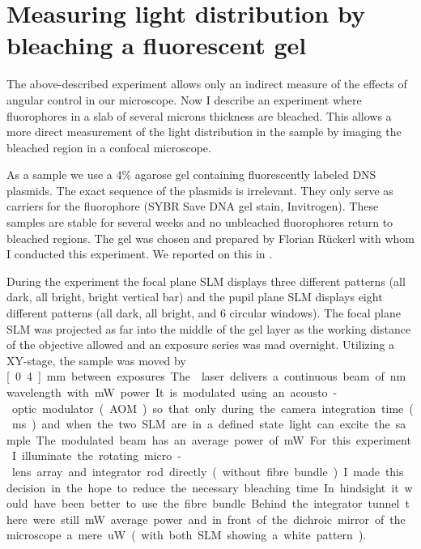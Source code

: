 \section{Measuring light distribution by bleaching a fluorescent gel}
The above-described experiment allows only an indirect measure of the
effects of angular control in our microscope. Now I describe an
experiment where fluorophores in a slab of several microns thickness
are bleached. This allows a more direct measurement of the light
distribution in the sample by imaging the bleached region in a
confocal microscope.

As a sample we use a 4\% agarose gel containing fluorescently labeled
DNS plasmids. The exact sequence of the plasmids is irrelevant. They
only serve as carriers for the fluorophore (SYBR Save DNA gel stain,
Invitrogen). These samples are stable for several weeks and no
unbleached fluorophores return to bleached regions. The gel was chosen
and prepared by Florian R\"uckerl with whom I conducted this
experiment. We reported on this in \cite{Ruckerl}.

During the experiment the focal plane SLM displays three different
patterns (all dark, all bright, bright vertical bar) and the pupil
plane SLM displays eight different patterns (all dark, all bright, and
6 circular windows). The focal plane SLM was projected as far into the
middle of the gel layer as the working distance of the objective
allowed and an exposure series was mad overnight. Utilizing a
XY-stage, the sample was moved by \unit[0.4]{mm} between exposures.


The  laser delivers a continuous beam of
\unit[473]{nm} wavelength with \unit[400]{mW} power. It is modulated
using an acousto-optic modulator (AOM) so that only during the camera
integration time (\unit[20]{ms}) and when the two SLM are in a defined
state light can excite the sample. The modulated beam has an average
power of \unit[15]{mW}. For this experiment I illuminate the rotating
micro-lens array and integrator rod directly (without fibre bundle). I
made this decision in the hope to reduce the necessary bleaching
time. In hindsight it would have been better to use the fibre
bundle. Behind the integrator tunnel there were still \unit[7]{mW}
average power and in front of the dichroic mirror of the microscope a
mere \unit[17]{uW} (with both SLM showing a white pattern).

